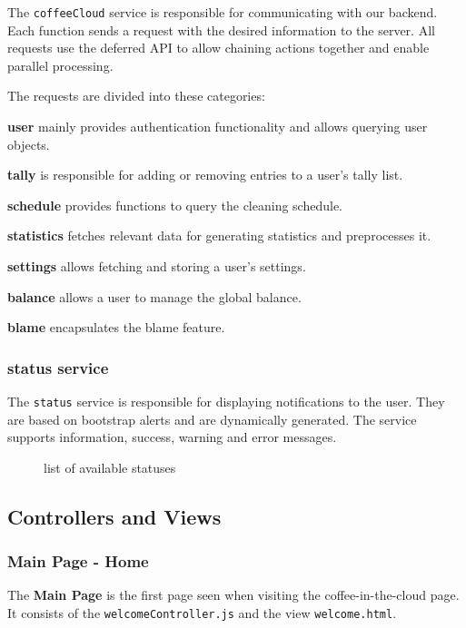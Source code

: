 The \texttt{coffeeCloud} service is responsible for communicating with
our backend. Each function sends a request with the desired information
to the server. All requests use the deferred API to allow chaining
actions together and enable parallel processing.

The requests are divided into these categories:

\textbf{user} mainly provides authentication functionality and allows
querying user objects.

\textbf{tally} is responsible for adding or removing entries to a user's
tally list.

\textbf{schedule} provides functions to query the cleaning schedule.

\textbf{statistics} fetches relevant data for generating statistics and
preprocesses it.

\textbf{settings} allows fetching and storing a user's settings.

\textbf{balance} allows a user to manage the global balance.

\textbf{blame} encapsulates the blame feature.

\subsubsection{status service}\label{status-service}

The \texttt{status} service is responsible for displaying notifications
to the user. They are based on bootstrap alerts and are dynamically
generated. The service supports information, success, warning and error
messages.

\begin{figure}[htbp]
\centering
{}
\caption{list of available statuses}
\end{figure}

\subsection{Controllers and Views}\label{controllers-and-views}

\subsubsection{Main Page - Home}\label{main-page---home}

The \textbf{Main Page} is the first page seen when visiting the
coffee-in-the-cloud page. It consists of the
\texttt{welcomeController.js} and the view \texttt{welcome.html}.

